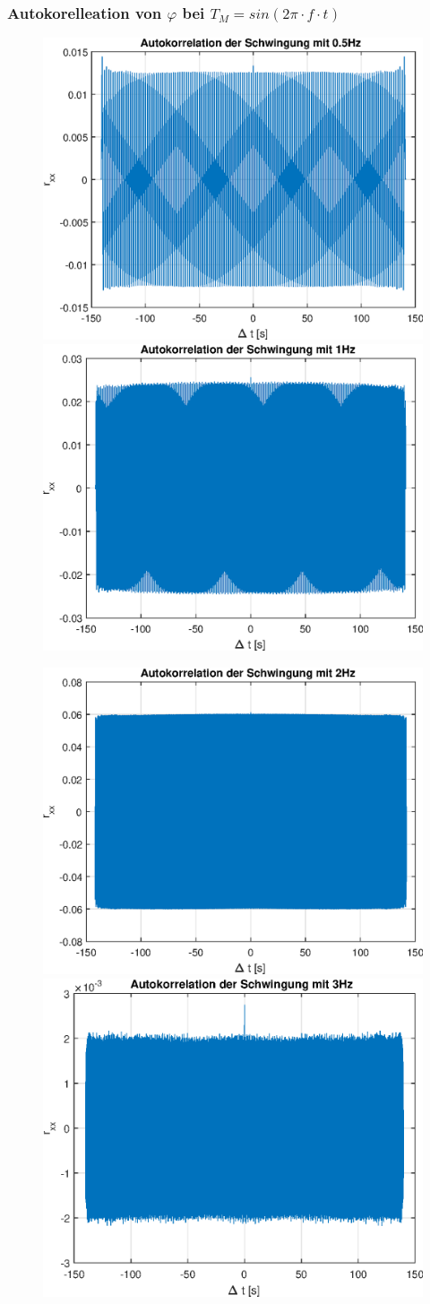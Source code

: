 \documentclass{article}
\begin{document}
\subsubsection{Autokorelleation von $\varphi$ bei $T_M = sin(2\pi\cdot f\cdot t)$}
\begin{figure}[!h]
\includegraphics[width=0.5\linewidth]{img/rxx_sinefreq_0_5}
\includegraphics[width=0.5\linewidth]{img/rxx_sinefreq_1}
\end{figure}
\begin{figure}[!h]
\includegraphics[width=0.5\linewidth]{img/rxx_sinefreq_2}
\includegraphics[width=0.5\linewidth]{img/rxx_sinefreq_3}
\end{figure}
\end{document}
